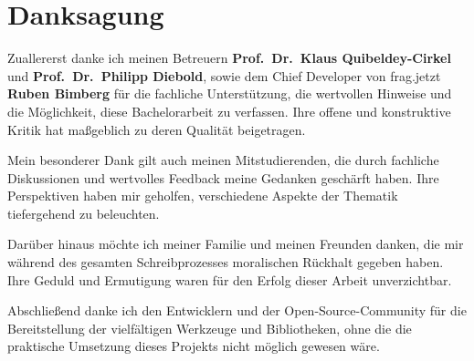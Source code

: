 
\chapter*{Danksagung}
\label{ch:danksagung}

Zuallererst danke ich meinen Betreuern \textbf{Prof.~Dr.~Klaus Quibeldey-Cirkel} und \textbf{Prof.~Dr.~Philipp Diebold}, sowie dem Chief Developer von frag.jetzt \textbf{Ruben Bimberg} für die fachliche Unterstützung, die wertvollen Hinweise und die Möglichkeit, diese Bachelorarbeit zu verfassen. Ihre offene und konstruktive Kritik hat maßgeblich zu deren Qualität beigetragen.

Mein besonderer Dank gilt auch meinen Mitstudierenden, die durch fachliche Diskussionen und wertvolles Feedback meine Gedanken geschärft haben. Ihre Perspektiven haben mir geholfen, verschiedene Aspekte der Thematik tiefergehend zu beleuchten.

Darüber hinaus möchte ich meiner Familie und meinen Freunden danken, die mir während des gesamten Schreibprozesses moralischen Rückhalt gegeben haben. Ihre Geduld und Ermutigung waren für den Erfolg dieser Arbeit unverzichtbar.

Abschließend danke ich den Entwicklern und der Open-Source-Community für die Bereitstellung der vielfältigen Werkzeuge und Bibliotheken, ohne die die praktische Umsetzung dieses Projekts nicht möglich gewesen wäre.
\vspace*{\fill}
\newpage

